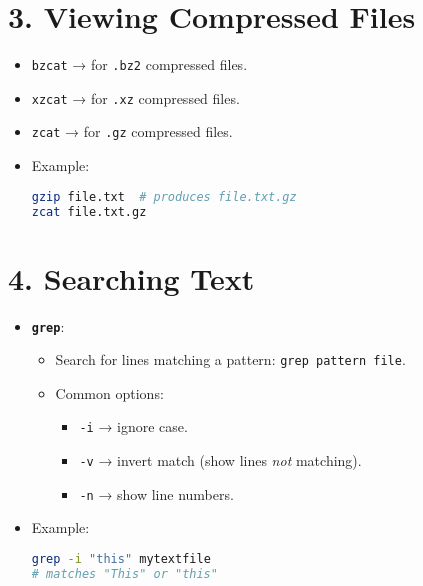\documentclass[a4paper]{report}
\begin{document}
\section*{3. Viewing Compressed Files}
\begin{itemize}
    \item \texttt{bzcat} → for \texttt{.bz2} compressed files.
    \item \texttt{xzcat} → for \texttt{.xz} compressed files.
    \item \texttt{zcat} → for \texttt{.gz} compressed files.
    \item Example:
    \begin{lstlisting}[language=bash]
gzip file.txt  # produces file.txt.gz
zcat file.txt.gz
    \end{lstlisting}
\end{itemize}

\section*{4. Searching Text}
\begin{itemize}
    \item \textbf{\texttt{grep}}:
    \begin{itemize}
        \item Search for lines matching a pattern: \texttt{grep pattern file}.
        \item Common options:
        \begin{itemize}
            \item \texttt{-i} → ignore case.
            \item \texttt{-v} → invert match (show lines \textit{not} matching).
            \item \texttt{-n} → show line numbers.
        \end{itemize}
    \end{itemize}
    \item Example:
    \begin{lstlisting}[language=bash]
grep -i "this" mytextfile
# matches "This" or "this"
    \end{lstlisting}
\end{itemize}
\end{document}
